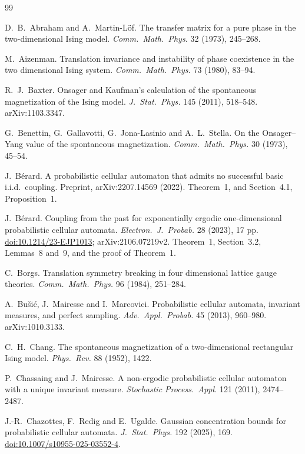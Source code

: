 \documentclass[11pt]{article}
\theoremstyle{plain}
\theoremstyle{definition}
\theoremstyle{remark}
\begin{document}
\begin{thebibliography}{99}
\small

 D.~B.~Abraham and A.~Martin-L\"of. The transfer matrix for a pure phase in the two-dimensional Ising model. \emph{Comm.\ Math.\ Phys.} 32 (1973), 245--268.

 M.~Aizenman. Translation invariance and instability of phase coexistence in the two dimensional Ising system. \emph{Comm.\ Math.\ Phys.} 73 (1980), 83--94.

 R.~J.~Baxter. Onsager and Kaufman's calculation of the spontaneous magnetization of the Ising model. \emph{J.\ Stat.\ Phys.} 145 (2011), 518--548. arXiv:1103.3347.

 G.~Benettin, G.~Gallavotti, G.~Jona-Lasinio and A.~L.~Stella. On the Onsager--Yang value of the spontaneous magnetization. \emph{Comm.\ Math.\ Phys.} 30 (1973), 45--54.

 J.~B\'erard. A probabilistic cellular automaton that admits no successful basic i.i.d.\ coupling. Preprint, arXiv:2207.14569 (2022). Theorem~1, and Section~4.1, Proposition~1.

 J.~B\'erard. Coupling from the past for exponentially ergodic one-dimensional probabilistic cellular automata. \emph{Electron.\ J.\ Probab.} 28 (2023), 17 pp. \href{https://doi.org/10.1214/23-EJP1013}{doi:10.1214/23-EJP1013}; arXiv:2106.07219v2. Theorem~1, Section~3.2, Lemmas~8 and~9, and the proof of Theorem~1.

 C.~Borgs. Translation symmetry breaking in four dimensional lattice gauge theories. \emph{Comm.\ Math.\ Phys.} 96 (1984), 251--284.

 A.~Bu\v{s}i\'c, J.~Mairesse and I.~Marcovici. Probabilistic cellular automata, invariant measures, and perfect sampling. \emph{Adv.\ Appl.\ Probab.} 45 (2013), 960--980. arXiv:1010.3133.

 C.~H.~Chang. The spontaneous magnetization of a two-dimensional rectangular Ising model. \emph{Phys.\ Rev.} 88 (1952), 1422.

 P.~Chassaing and J.~Mairesse. A non-ergodic probabilistic cellular automaton with a unique invariant measure. \emph{Stochastic Process.\ Appl.} 121 (2011), 2474--2487.

 J.-R.~Chazottes, F.~Redig and E.~Ugalde. Gaussian concentration bounds for probabilistic cellular automata. \emph{J.\ Stat.\ Phys.} 192 (2025), 169. \href{https://doi.org/10.1007/s10955-025-03552-4}{doi:10.1007/s10955-025-03552-4}.


\end{thebibliography}
\end{document}
